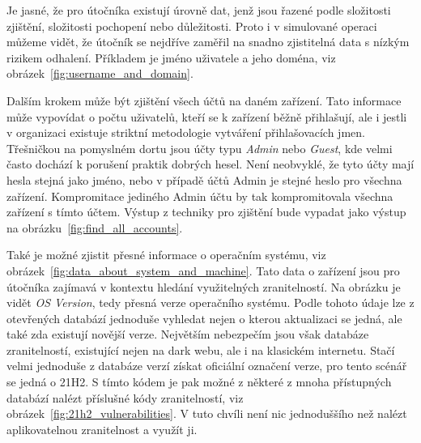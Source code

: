 Je jasné, že pro útočníka existují úrovně dat, jenž jsou řazené podle složitosti zjištění, složitosti pochopení nebo důležitosti.
Proto i v simulované operaci můžeme vidět, že útočník se nejdříve zaměřil na snadno zjistitelná data s nízkým rizikem odhalení.
Příkladem je jméno uživatele a jeho doména, viz obrázek~\ref{fig:username_and_domain}.



Dalším krokem může být zjištění všech účtů na daném zařízení.
Tato informace může vypovídat o počtu uživatelů, kteří se k zařízení běžně přihlašují, ale i jestli v organizaci existuje striktní metodologie vytváření přihlašovacích jmen.
Třešničkou na pomyslném dortu jsou účty typu \textit{Admin} nebo \textit{Guest}, kde velmi často dochází k porušení praktik dobrých hesel.
Není neobvyklé, že tyto účty mají hesla stejná jako jméno, nebo v případě účtů Admin je stejné heslo pro všechna zařízení.
Kompromitace jediného Admin účtu by tak kompromitovala všechna zařízení s tímto účtem.
Výstup z techniky pro zjištění bude vypadat jako výstup na obrázku~\ref{fig:find_all_accounts}.


Také je možné zjistit přesné informace o operačním systému, viz obrázek~\ref{fig:data_about_system_and_machine}.
Tato data o zařízení jsou pro útočníka zajímavá v kontextu hledání využitelných zranitelností.
Na obrázku je vidět \textit{OS Version}, tedy přesná verze operačního systému.
Podle tohoto údaje lze z otevřených databází jednoduše vyhledat nejen o kterou aktualizaci se jedná, ale také zda existují novější verze.
Největším nebezpečím jsou však databáze zranitelností, existující nejen na dark webu, ale i na klasickém internetu.
Stačí velmi jednoduše z databáze verzí získat oficiální označení verze, pro tento scénář se jedná o 21H2\cite{win_versions}.
S tímto kódem je pak možné z některé z mnoha přístupných databází nalézt příslušné kódy zranitelností, viz obrázek~\ref{fig:21h2_vulnerabilities}.
V tuto chvíli není nic jednoduššího než nalézt aplikovatelnou zranitelnost a využít ji.

~
~

